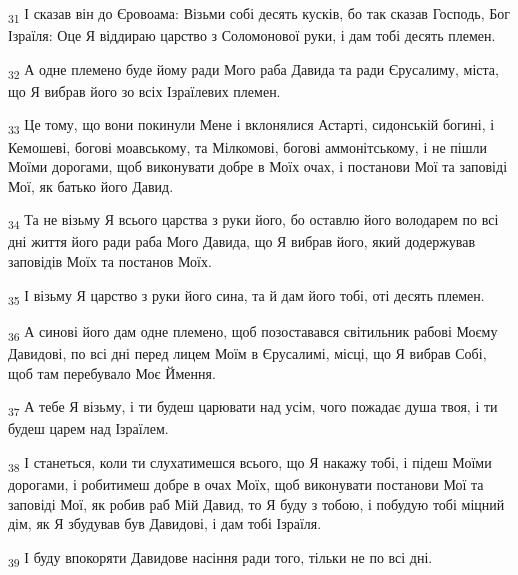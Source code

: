 \begin{tcolorbox}
\textsubscript{31} І сказав він до Єровоама: Візьми собі десять кусків, бо так сказав Господь, Бог Ізраїля: Оце Я віддираю царство з Соломонової руки, і дам тобі десять племен.
\end{tcolorbox}
\begin{tcolorbox}
\textsubscript{32} А одне племено буде йому ради Мого раба Давида та ради Єрусалиму, міста, що Я вибрав його зо всіх Ізраїлевих племен.
\end{tcolorbox}
\begin{tcolorbox}
\textsubscript{33} Це тому, що вони покинули Мене і вклонялися Астарті, сидонській богині, і Кемошеві, богові моавському, та Мілкомові, богові аммонітському, і не пішли Моїми дорогами, щоб виконувати добре в Моїх очах, і постанови Мої та заповіді Мої, як батько його Давид.
\end{tcolorbox}
\begin{tcolorbox}
\textsubscript{34} Та не візьму Я всього царства з руки його, бо оставлю його володарем по всі дні життя його ради раба Мого Давида, що Я вибрав його, який додержував заповідів Моїх та постанов Моїх.
\end{tcolorbox}
\begin{tcolorbox}
\textsubscript{35} І візьму Я царство з руки його сина, та й дам його тобі, оті десять племен.
\end{tcolorbox}
\begin{tcolorbox}
\textsubscript{36} А синові його дам одне племено, щоб позоставався світильник рабові Моєму Давидові, по всі дні перед лицем Моїм в Єрусалимі, місці, що Я вибрав Собі, щоб там перебувало Моє Ймення.
\end{tcolorbox}
\begin{tcolorbox}
\textsubscript{37} А тебе Я візьму, і ти будеш царювати над усім, чого пожадає душа твоя, і ти будеш царем над Ізраїлем.
\end{tcolorbox}
\begin{tcolorbox}
\textsubscript{38} І станеться, коли ти слухатимешся всього, що Я накажу тобі, і підеш Моїми дорогами, і робитимеш добре в очах Моїх, щоб виконувати постанови Мої та заповіді Мої, як робив раб Мій Давид, то Я буду з тобою, і побудую тобі міцний дім, як Я збудував був Давидові, і дам тобі Ізраїля.
\end{tcolorbox}
\begin{tcolorbox}
\textsubscript{39} І буду впокоряти Давидове насіння ради того, тільки не по всі дні.
\end{tcolorbox}

